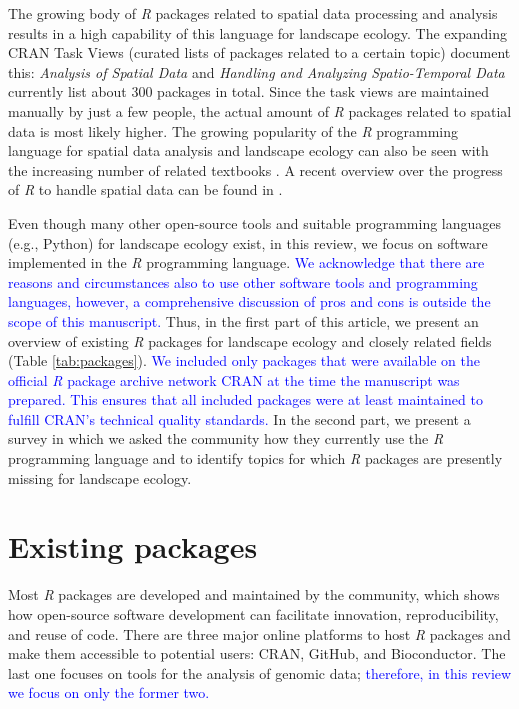 \documentclass[smallextended]{svjour3}       %
\begin{document}
The growing body of \textit{R} packages related to spatial data processing and analysis results in a high capability of this language for landscape ecology.
The expanding CRAN Task Views (curated lists of packages related to a certain topic) document this: \textit{Analysis of Spatial Data} \cite{Bivand2019a} and \textit{Handling and Analyzing Spatio-Temporal Data} \cite{Pebesma2020} currently list about 300 packages in total.
Since the task views are maintained manually by just a few people, the actual amount of \textit{R} packages related to spatial data is most likely higher.
The growing popularity of the \textit{R} programming language for spatial data analysis and landscape ecology can also be seen with the increasing number of related textbooks \cite{Wegmann2016,Fletcher2018,Lovelace2019,Pebesma2019a}.
A recent overview over the progress of \textit{R} to handle spatial data can be found in \cite{Bivand2020}.

Even though many other open-source tools \cite{QGISDevelopmentTeam2016,GRASSDevelopmentTeam2017,Porta2017} and suitable programming languages (e.g., Python) for landscape ecology exist, in this review, we focus on software implemented in the \textit{R} programming language.
\textcolor{blue}{We acknowledge that there are reasons and circumstances also to use other software tools and programming languages, however, a comprehensive discussion of pros and cons is outside the scope of this manuscript.}
Thus, in the first part of this article, we present an overview of existing \textit{R} packages for landscape ecology and closely related fields (Table \ref{tab:packages}).
\textcolor{blue}{We included only packages that were available on the official \textit{R} package archive network CRAN at the time the manuscript was prepared.  
This ensures that all included packages were at least maintained to fulfill CRAN's technical quality standards.}
In the second part, we present a survey in which we asked the community how they currently use the \textit{R} programming language and to identify topics for which \textit{R} packages are presently missing for landscape ecology.

\hypertarget{sec:existing_packages}{%
\section{Existing packages}\label{sec:existing_packages}}

Most \textit{R} packages are developed and maintained by the community, which shows how open-source software development can facilitate innovation, reproducibility, and reuse of code.
There are three major online platforms to host \textit{R} packages and make them accessible to potential users: CRAN, GitHub, and Bioconductor.
The last one focuses on tools for the analysis of genomic data; \textcolor{blue}{therefore, in this review we focus on only the former two.}
\end{document}
